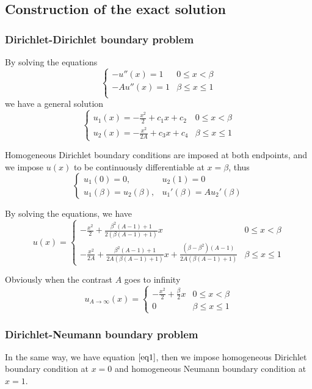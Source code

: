 \documentclass[12pt]{article}
\begin{document}
\subsection{Construction of the exact solution}
\subsubsection{Dirichlet-Dirichlet boundary problem}
By solving the equations
\[
\begin{cases}
-u''(x)=1 & 0 \leq x < \beta \\
-Au''(x)=1 & \beta \leq x \leq 1 \\
\end{cases}
\]
we have a general solution
\begin{equation} \label{eq1}
\begin{cases}
u_{1}(x)=-\frac{x^2}{2}+c_{1}x+c_{2} & 0 \leq x < \beta \\
u_{2}(x)=-\frac{x^2}{2A}+c_{3}x+c_{4} & \beta \leq x \leq 1
\end{cases}
\end{equation}

Homogeneous Dirichlet boundary conditions are imposed at both endpoints, and we impose $u(x)$ to be continuously differentiable at $x=\beta$, thus
\[
\begin{cases}
u_{1}(0)=0, & u_{2}(1)=0 \\
u_{1}(\beta)=u_{2}(\beta), & u_{1}'(\beta)=Au_{2}'(\beta)
\end{cases}
\]

By solving the equations, we have
\[
u(x)=
\begin{cases}
-\frac{x^2}{2}+\frac{\beta^2(A-1)+1}{2(\beta(A-1)+1)}x & 0 \leq x < \beta \\
-\frac{x^2}{2A}+\frac{\beta^2(A-1)+1}{2A(\beta(A-1)+1)}x+\frac{(\beta-\beta^2)(A-1)}{2A(\beta(A-1)+1)} & \beta \leq x \leq 1
\end{cases}
\]

Obviously when the contrast $A$ goes to infinity
\[
u_{A \to \infty}(x)=
\begin{cases}
-\frac{x^2}{2}+\frac{\beta}{2}x & 0 \leq x < \beta \\
0 & \beta \leq x \leq 1
\end{cases}
\]

\subsubsection{Dirichlet-Neumann boundary problem}
In the same way, we have equation $\ref{eq1}$, then we impose homogeneous Dirichlet boundary condition at $x=0$ and homogeneous Neumann boundary condition at $x=1$.
\end{document}
